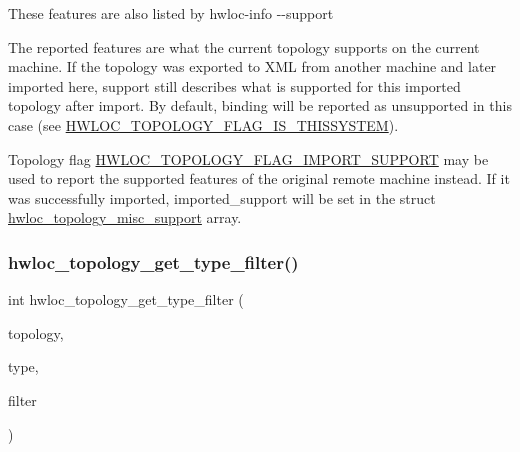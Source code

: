 These features are also listed by hwloc-\/info -\/-\/support

The reported features are what the current topology supports on the current machine. If the topology was exported to X\+ML from another machine and later imported here, support still describes what is supported for this imported topology after import. By default, binding will be reported as unsupported in this case (see \hyperlink{a00193_ggada025d3ec20b4b420f8038d23d6e7bdea6ecb6abc6a0bb75e81564f8bca85783b}{H\+W\+L\+O\+C\+\_\+\+T\+O\+P\+O\+L\+O\+G\+Y\+\_\+\+F\+L\+A\+G\+\_\+\+I\+S\+\_\+\+T\+H\+I\+S\+S\+Y\+S\+T\+EM}).

Topology flag \hyperlink{a00193_ggada025d3ec20b4b420f8038d23d6e7bdead93e82b8668ee90e4f9354e201a2ed9c}{H\+W\+L\+O\+C\+\_\+\+T\+O\+P\+O\+L\+O\+G\+Y\+\_\+\+F\+L\+A\+G\+\_\+\+I\+M\+P\+O\+R\+T\+\_\+\+S\+U\+P\+P\+O\+RT} may be used to report the supported features of the original remote machine instead. If it was successfully imported, {\ttfamily imported\+\_\+support} will be set in the struct \hyperlink{a00302}{hwloc\+\_\+topology\+\_\+misc\+\_\+support} array. \mbox{\label{a00193_ga137ad1178f7a79f2383974d983083401}} 
\subsubsection{\texorpdfstring{hwloc\+\_\+topology\+\_\+get\+\_\+type\+\_\+filter()}{hwloc\_topology\_get\_type\_filter()}}
{\footnotesize\ttfamily int hwloc\+\_\+topology\+\_\+get\+\_\+type\+\_\+filter (\begin{DoxyParamCaption}\item[{\hyperlink{a00186_ga9d1e76ee15a7dee158b786c30b6a6e38}{hwloc\+\_\+topology\+\_\+t}}]{topology,  }\item[{\hyperlink{a00184_gacd37bb612667dc437d66bfb175a8dc55}{hwloc\+\_\+obj\+\_\+type\+\_\+t}}]{type,  }\item[{enum \hyperlink{a00193_ga9a5a1f0140cd1952544477833733195b}{hwloc\+\_\+type\+\_\+filter\+\_\+e} $\ast$}]{filter }\end{DoxyParamCaption})}




